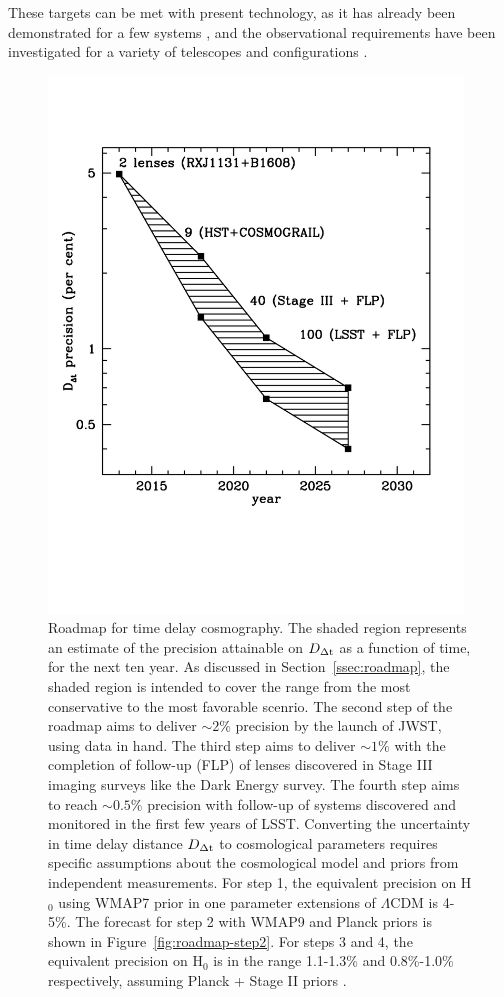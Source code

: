These targets can be met with present technology, as it has already
been demonstrated for a few systems \citep{Tew++13,Suy++13}, and the
observational requirements have been investigated for a variety of
telescopes and configurations
\citep{Gre++13,Collett:2013p34320,Men++15,Lin15}.

\begin{figure}
\includegraphics[width=0.98\textwidth]{figures/roadmap.pdf}
\caption{Roadmap for time delay cosmography. The shaded region represents an estimate of the precision attainable on $D_{\Delta{\rm t}}$ as a function of time, for the next ten year. As discussed in Section~\ref{ssec:roadmap}, the shaded region is intended to cover the range from the most conservative to the most favorable scenrio. The second step of the roadmap aims to deliver $\sim2\%$ precision by the launch of JWST, using data in hand. The third step aims to deliver $\sim1\%$ with the completion of follow-up (FLP) of lenses discovered in Stage III imaging surveys like the Dark Energy survey. The fourth step aims to reach $\sim0.5\%$ precision with follow-up of systems discovered and monitored in the first few years of LSST. Converting the uncertainty in time delay distance $D_{\Delta{\rm t}}$ to cosmological parameters requires specific assumptions about the cosmological model and priors from independent measurements. For step 1, the equivalent precision on H$_0$ using WMAP7 prior in one parameter extensions of $\Lambda$CDM is 4-5\%. The forecast for step 2 with WMAP9 and Planck priors is shown in Figure~\ref{fig:roadmap-step2}. For steps 3 and 4, the equivalent precision on H$_0$ is in the range 1.1-1.3\% and 0.8\%-1.0\% respectively, assuming Planck + Stage II priors \citep{C+M09b}.}
\label{fig:roadmap} 
\end{figure}

